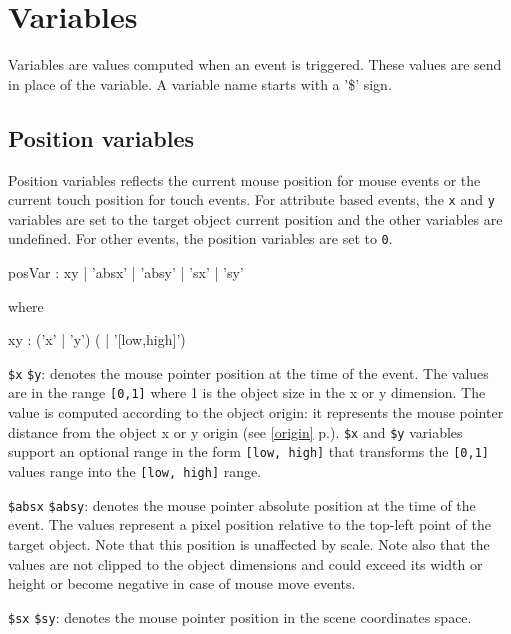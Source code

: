 \documentclass[a4paper,twoside]{report}
\newcommand{\sublevel}[1]	{\section{#1}}
\newcommand{\subsublevel}[1]	{\subsection{#1}}
\newcommand{\fullref}[1]	{\ref{#1} p.\pageref{#1}}
\newcommand{\OSC}[1]		{\texttt{#1}}
\newcommand{\values}[1]		{\texttt{#1}}
\let\olditemize\itemize
\let\oldenditemize\enditemize
\renewenvironment{itemize} 	{\olditemize \setlength{\itemsep}{1mm}}{\oldenditemize}
\begin{document}
\sublevel{Variables}
\label{interactvar}

Variables are values computed when an event is triggered. These values are send in place of the variable. A variable name starts with a '\$' sign. 

\subsublevel{Position variables}
\label{posvar}

Position variables reflects the current mouse position for mouse events or the current touch position for touch events. 
For attribute based events, the \OSC{x} and  \OSC{y} variables are set to the target object current position and the other variables are undefined. For other events, the position variables are set to \values{0}. 

\begin{rail} 
posVar : xy | 'absx' | 'absy' | 'sx' | 'sy' 
\end{rail}

where
\begin{rail} 
xy : ('x' | 'y') ( | '[low,high]') 
\end{rail}

\begin{itemize}
\item \OSC{\$x} \OSC{\$y}: denotes the mouse pointer position at the time of the event. The values are in the range \values{[0,1]} where 1 is the object size in the x or y dimension. The value is computed according to the object origin: it represents the mouse pointer distance from the object x or y origin (see \fullref{origin}). \OSC{\$x} and \OSC{\$y} variables support an optional range in the form \OSC{[low, high]} that transforms the \values{[0,1]}  values range into the \values{[low, high]} range.

\item \OSC{\$absx} \OSC{\$absy}: denotes the mouse pointer absolute position at the time of the event. The values represent a pixel position relative to the top-left point of the target object. Note that this position is unaffected by scale. 
Note also that the values are not clipped to the object dimensions and could exceed its width or height or become negative in case of mouse move events.

\item \OSC{\$sx} \OSC{\$sy}: denotes the mouse pointer position in the scene coordinates space. 
\end{itemize}
\end{document}
